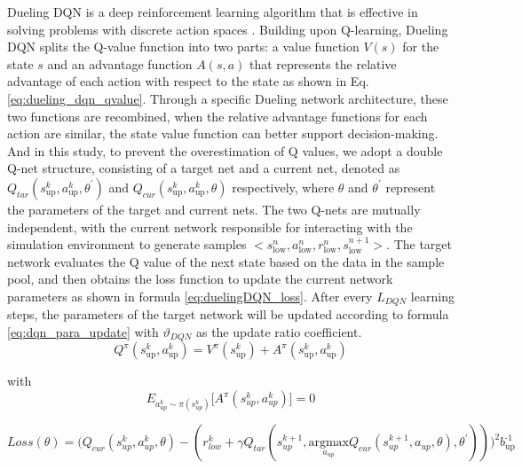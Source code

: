 \documentclass[preprint,12pt]{elsarticle}
\begin{document}
Dueling DQN is a deep reinforcement learning algorithm that is effective in solving problems with discrete action spaces \cite{pmlr-v48-wangf16}. Building upon Q-learning, Dueling DQN splits the Q-value function
into two parts: a value function $V(s)$ for the state $s$ and an advantage function $A(s,a)$ that represents the relative advantage of each action with respect to the state as shown in Eq. \ref{eq:dueling_dqn_qvalue}.
Through a specific Dueling network architecture, these two functions are recombined,\emph{ }when the relative advantage functions for each action are similar, the state value function can better support decision-making.
And in this study, to prevent the overestimation of Q values, we adopt a double Q-net structure, consisting of a target net and a current net, denoted as $Q_{tar}(s_{\textrm{up}}^{k},a_{\textrm{up}}^{k},\theta^{'})$ and $Q_{cur}(s_{\textrm{up}}^{k},a_{\textrm{up}}^{k},\theta)$ respectively, where $\theta$ and $\theta^{'}$ represent the parameters of the target and current nets. The two Q-nets are mutually independent, with the current network responsible for interacting with the simulation environment to generate samples $<s_{\textrm{low}}^{n},a_{\textrm{low}}^{n},r_{\textrm{low}}^{n},s_{\textrm{low}}^{n+1}>$. The target network evaluates the Q value of the next state based on the data in the sample pool, and then obtains the loss function to update the current network parameters as shown in formula \ref{eq:duelingDQN_loss}. After every $L_{DQN}$ learning steps, the parameters of the target network will be updated according to formula \ref{eq:dqn_para_update} with $\vartheta_{DQN}$ as the update ratio coefficient.
\begin{equation}
Q^{\pi}(s_{\textrm{up}}^{k},a_{\textrm{up}}^{k})=V^{\pi}(s_{\textrm{up}}^{k})+A^{\pi}(s_{\textrm{up}}^{k},a_{\textrm{up}}^{k})\label{eq:dueling_dqn_qvalue}
\end{equation}

with
\[
E_{a_{up}^{k}\sim\pi(s_{up}^{k})}\Biggl[A^{\pi}(s_{up}^{k},a_{up}^{k})\Biggr]=0
\]

\begin{equation}
Loss(\theta)=\Biggl(Q_{cur}(s_{up}^{k},a_{up}^{k},\theta)-(r_{low}^{k}+
\gamma Q_{tar}(s_{up}^{k+1},\underset{a_{up}}{\textrm{argmax}}Q_{cur}(s_{up}^{k+1},a_{up},\theta),\theta^{'}))\Biggr)^{2}b_{\textrm{up}}^{\textrm{-1}}
\label{eq:duelingDQN_loss}
\end{equation}
\end{document}
